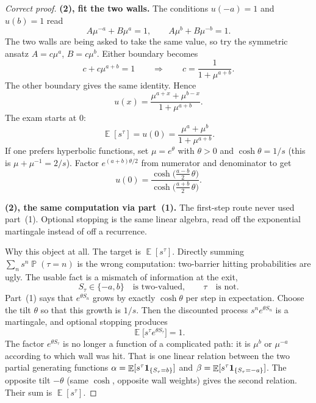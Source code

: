 \documentclass[11pt,a4paper]{article}
\DeclareMathOperator{\E}{\mathbb{E}}
\DeclareMathOperator{\Pbb}{\mathbb{P}}
\begin{document}
\begin{proof}[Correct proof]
\textbf{(2), fit the two walls.}
The conditions \( u(-a)=1 \) and \( u(b)=1 \) read
\[
A\mu^{-a}+B\mu^{a}
=
1,
\qquad
A\mu^{b}+B\mu^{-b}
=
1.
\]
The two walls are being asked to take the same value, so try the symmetric ansatz \( A=c\mu^{a} \), \( B=c\mu^{b} \). Either boundary becomes
\[
c+c\mu^{a+b}
=
1
\qquad\Longrightarrow\qquad
c
=
\frac{1}{1+\mu^{a+b}}.
\]
The other boundary gives the same identity. Hence
\[
u(x)
=
\frac{\mu^{a+x}+\mu^{b-x}}{1+\mu^{a+b}}.
\]
The exam starts at \( 0 \):
\[
\E[s^{\tau}]
=
u(0)
=
\frac{\mu^{a}+\mu^{b}}{1+\mu^{a+b}}.
\]
If one prefers hyperbolic functions, set \( \mu=e^{\theta} \) with \( \theta>0 \) and \( \cosh\theta=1/s \) (this is \( \mu+\mu^{-1}=2/s \)). Factor \( e^{(a+b)\theta/2} \) from numerator and denominator to get
\[
u(0)
=
\frac{\cosh\bigl(\tfrac{a-b}{2}\,\theta\bigr)}{\cosh\bigl(\tfrac{a+b}{2}\,\theta\bigr)}.
\]

\textbf{(2), the same computation via part~(1).}
The first-step route never used part~(1). Optional stopping is the same linear algebra, read off the exponential martingale instead of off a recurrence.

Why this object at all. The target is \( \E[s^{\tau}] \). Directly summing \( \sum_n s^{n}\Pbb(\tau=n) \) is the wrong computation: two-barrier hitting probabilities are ugly. The usable fact is a mismatch of information at the exit,
\[
S_{\tau}\in\{-a,b\}
\quad\text{is two-valued},\qquad
\tau
\quad\text{is not}.
\]
Part~(1) says that \( e^{\theta S_n} \) grows by exactly \( \cosh\theta \) per step in expectation. Choose the tilt \( \theta \) so that this growth is \( 1/s \). Then the discounted process \( s^{n}e^{\theta S_n} \) is a martingale, and optional stopping produces
\[
\E\bigl[s^{\tau}e^{\theta S_{\tau}}\bigr]
=
1.
\]
The factor \( e^{\theta S_{\tau}} \) is no longer a function of a complicated path: it is \( \mu^{b} \) or \( \mu^{-a} \) according to which wall was hit. That is one linear relation between the two partial generating functions \( \alpha=\E[s^{\tau}\ind_{\{S_{\tau}=b\}}] \) and \( \beta=\E[s^{\tau}\ind_{\{S_{\tau}=-a\}}] \). The opposite tilt \( -\theta \) (same \( \cosh \), opposite wall weights) gives the second relation. Their sum is \( \E[s^{\tau}] \).


\end{proof}
\end{document}
